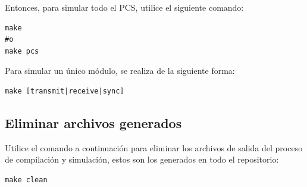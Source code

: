 Entonces, para simular todo el PCS, utilice el siguiente comando:
\begin{verbatim}
make
#o
make pcs
\end{verbatim}

Para simular un único módulo, se realiza de la siguiente forma:
\begin{verbatim}
make [transmit|receive|sync]
\end{verbatim}

\subsection*{Eliminar archivos generados}

Utilice el comando a continuación para eliminar los archivos de salida del proceso de compilación y simulación, estos son los generados en todo el repositorio:

\begin{verbatim}
make clean
\end{verbatim}
